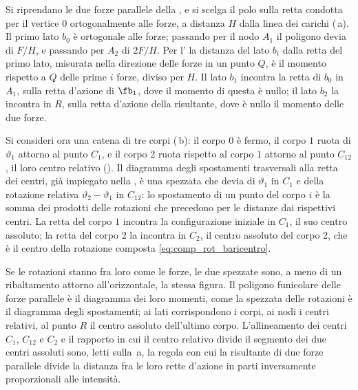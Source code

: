 Si riprendano le due forze parallele della , e si scelga il polo sulla
retta condotta per il vertice $0$ ortogonalmente alle forze, a distanza $H$ dalla linea dei
carichi (\,a). Il primo lato $b_0$ è ortogonale alle forze; passando per
il nodo $A_1$ il poligono devia di $F/H$, e passando per $A_2$ di $2F/H$. Per
l' la distanza del lato $b_i$ dalla retta del primo lato,
misurata nella direzione delle forze in un punto $Q$, è il momento rispetto a $Q$ delle prime $i$
forze, diviso per $H$. Il lato $b_1$ incontra la retta di $b_0$ in $A_1$, sulla retta d'azione di
$\fb_1$, dove il momento di questa è nullo; il lato $b_2$ la incontra in $R$, sulla retta
d'azione della risultante, dove è nullo il momento delle due forze.

Si consideri ora una catena di tre corpi (\,b): il corpo $0$ è fermo, il
corpo $1$ ruota di $\vartheta_1$ attorno al punto $C_1$, e il corpo $2$ ruota rispetto al corpo
$1$ attorno al punto $C_{12}$, il loro centro relativo (). Il diagramma
degli spostamenti trasversali alla retta dei centri, già impiegato nella
, è una spezzata che devia di $\vartheta_1$ in $C_1$ e della
rotazione relativa $\vartheta_2 - \vartheta_1$ in $C_{12}$: lo spostamento di un punto del corpo
$i$ è la somma dei prodotti delle rotazioni che precedono per le distanze dai rispettivi centri.
La retta del corpo $1$ incontra la configurazione iniziale in $C_1$, il suo centro assoluto; la
retta del corpo $2$ la incontra in $C_2$, il centro assoluto del corpo $2$, che è il centro della
rotazione composta \eqref{eq:comp_rot_baricentro}.

Se le rotazioni stanno fra loro come le forze, le due spezzate sono, a meno di un ribaltamento
attorno all'orizzontale, la stessa figura. Il poligono
funicolare delle forze parallele è il diagramma dei loro momenti, come la spezzata delle
rotazioni è il diagramma degli spostamenti; ai lati corrispondono i corpi, ai nodi i centri
relativi, al punto $R$ il centro assoluto dell'ultimo corpo. L'allineamento dei centri $C_1$,
$C_{12}$ e $C_2$ e il rapporto in cui il centro relativo divide il segmento dei due centri
assoluti sono, letti sulla \,a, la regola con cui la risultante di due
forze parallele divide la distanza fra le loro rette d'azione in parti inversamente proporzionali
alle intensità.

